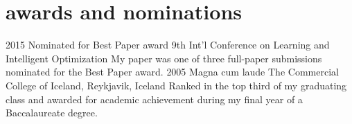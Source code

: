 \section{awards and nominations}
\begin{entrylist}
\entry
{2015}
{Nominated for Best Paper award}
{9th Int'l Conference on Learning and Intelligent Optimization}
{My paper  was one of three full-paper submissions nominated for the Best Paper award.}
\entry
{2005}
{Magna cum laude}
{The Commercial College of Iceland, Reykjavik, Iceland}
{Ranked in the top third of my graduating class and awarded for academic achievement during my final year of a Baccalaureate degree.}
\end{entrylist}
